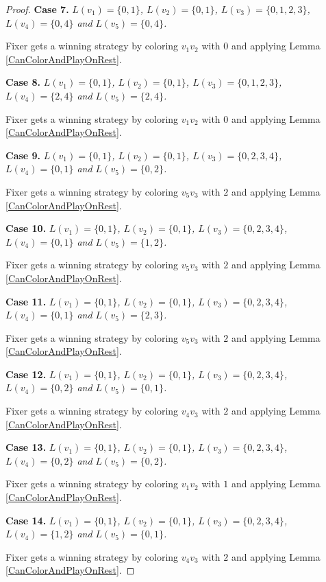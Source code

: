 \documentclass[12pt]{amsart}
\theoremstyle{plain}
\theoremstyle{definition}
\theoremstyle{remark}
\begin{document}
\begin{proof}
\noindent\textbf{Case 7.  }\textit{$L(v_1) = \{0, 1\}$, $L(v_2) = \{0, 1\}$, $L(v_3) = \{0, 1, 2, 3\}$, $L(v_4) = \{0, 4\}$ and $L(v_5) = \{0, 4\}$.}

Fixer gets a winning strategy by coloring $v_1v_2$ with $0$ and applying Lemma \ref{CanColorAndPlayOnRest}.

\noindent\textbf{Case 8.  }\textit{$L(v_1) = \{0, 1\}$, $L(v_2) = \{0, 1\}$, $L(v_3) = \{0, 1, 2, 3\}$, $L(v_4) = \{2, 4\}$ and $L(v_5) = \{2, 4\}$.}

Fixer gets a winning strategy by coloring $v_1v_2$ with $0$ and applying Lemma \ref{CanColorAndPlayOnRest}.

\noindent\textbf{Case 9.  }\textit{$L(v_1) = \{0, 1\}$, $L(v_2) = \{0, 1\}$, $L(v_3) = \{0, 2, 3, 4\}$, $L(v_4) = \{0, 1\}$ and $L(v_5) = \{0, 2\}$.}

Fixer gets a winning strategy by coloring $v_5v_3$ with $2$ and applying Lemma \ref{CanColorAndPlayOnRest}.

\noindent\textbf{Case 10.  }\textit{$L(v_1) = \{0, 1\}$, $L(v_2) = \{0, 1\}$, $L(v_3) = \{0, 2, 3, 4\}$, $L(v_4) = \{0, 1\}$ and $L(v_5) = \{1, 2\}$.}

Fixer gets a winning strategy by coloring $v_5v_3$ with $2$ and applying Lemma \ref{CanColorAndPlayOnRest}.

\noindent\textbf{Case 11.  }\textit{$L(v_1) = \{0, 1\}$, $L(v_2) = \{0, 1\}$, $L(v_3) = \{0, 2, 3, 4\}$, $L(v_4) = \{0, 1\}$ and $L(v_5) = \{2, 3\}$.}

Fixer gets a winning strategy by coloring $v_5v_3$ with $2$ and applying Lemma \ref{CanColorAndPlayOnRest}.

\noindent\textbf{Case 12.  }\textit{$L(v_1) = \{0, 1\}$, $L(v_2) = \{0, 1\}$, $L(v_3) = \{0, 2, 3, 4\}$, $L(v_4) = \{0, 2\}$ and $L(v_5) = \{0, 1\}$.}

Fixer gets a winning strategy by coloring $v_4v_3$ with $2$ and applying Lemma \ref{CanColorAndPlayOnRest}.

\noindent\textbf{Case 13.  }\textit{$L(v_1) = \{0, 1\}$, $L(v_2) = \{0, 1\}$, $L(v_3) = \{0, 2, 3, 4\}$, $L(v_4) = \{0, 2\}$ and $L(v_5) = \{0, 2\}$.}

Fixer gets a winning strategy by coloring $v_1v_2$ with $1$ and applying Lemma \ref{CanColorAndPlayOnRest}.

\noindent\textbf{Case 14.  }\textit{$L(v_1) = \{0, 1\}$, $L(v_2) = \{0, 1\}$, $L(v_3) = \{0, 2, 3, 4\}$, $L(v_4) = \{1, 2\}$ and $L(v_5) = \{0, 1\}$.}

Fixer gets a winning strategy by coloring $v_4v_3$ with $2$ and applying Lemma \ref{CanColorAndPlayOnRest}.


\end{proof}
\end{document}
